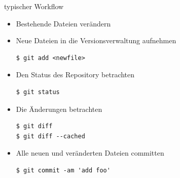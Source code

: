 \begin{frame}[fragile]{typischer Workflow}
  \begin{itemize}
    \item Bestehende Dateien verändern
    \item Neue Dateien in die Versionsverwaltung aufnehmen
    \begin{lstlisting}
$ git add <newfile>
    \end{lstlisting}
    \item Den Status des Repository betrachten
    \begin{lstlisting}
$ git status
    \end{lstlisting}
    \item Die Änderungen betrachten
    \begin{lstlisting}
$ git diff
$ git diff --cached
    \end{lstlisting}
    \item Alle neuen und veränderten Dateien committen
    \begin{lstlisting}
$ git commit -am 'add foo'
    \end{lstlisting}
    \end{itemize}
\end{frame}

